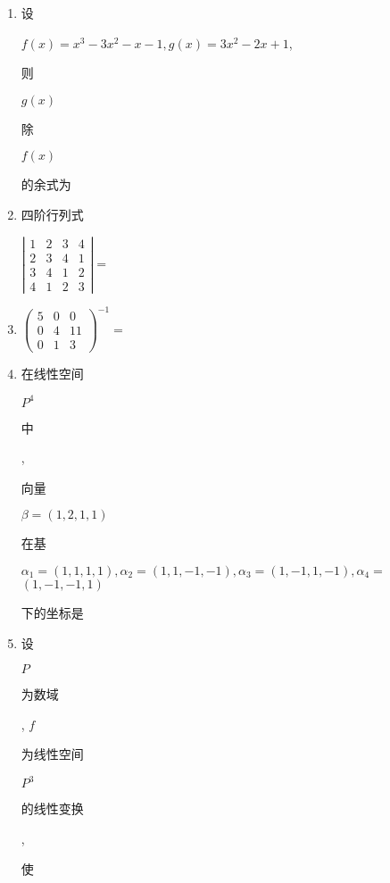 \documentclass[10pt]{article}
\begin{document}
\begin{enumerate}
  \item \begin{CJK}{UTF8}{mj}设\end{CJK} $f(x)=x^{3}-3 x^{2}-x-1, g(x)=3 x^{2}-2 x+1$, \begin{CJK}{UTF8}{mj}则\end{CJK} $g(x)$ \begin{CJK}{UTF8}{mj}除\end{CJK} $f(x)$ \begin{CJK}{UTF8}{mj}的余式为\end{CJK}

  \item \begin{CJK}{UTF8}{mj}四阶行列式\end{CJK} $\left|\begin{array}{llll}1 & 2 & 3 & 4 \\ 2 & 3 & 4 & 1 \\ 3 & 4 & 1 & 2 \\ 4 & 1 & 2 & 3\end{array}\right|=$

  \item $\left(\begin{array}{ccc}5 & 0 & 0 \\ 0 & 4 & 11 \\ 0 & 1 & 3\end{array}\right)^{-1}=$

  \item \begin{CJK}{UTF8}{mj}在线性空间\end{CJK} $P^{4}$ \begin{CJK}{UTF8}{mj}中\end{CJK}, \begin{CJK}{UTF8}{mj}向量\end{CJK} $\beta=(1,2,1,1)$ \begin{CJK}{UTF8}{mj}在基\end{CJK} $\alpha_{1}=(1,1,1,1), \alpha_{2}=(1,1,-1,-1), \alpha_{3}=(1,-1,1,-1), \alpha_{4}=$ $(1,-1,-1,1)$ \begin{CJK}{UTF8}{mj}下的坐标是\end{CJK}

  \item \begin{CJK}{UTF8}{mj}设\end{CJK} $P$ \begin{CJK}{UTF8}{mj}为数域\end{CJK}, $f$ \begin{CJK}{UTF8}{mj}为线性空间\end{CJK} $P^{3}$ \begin{CJK}{UTF8}{mj}的线性变换\end{CJK}, \begin{CJK}{UTF8}{mj}使\end{CJK}

\end{enumerate}
\end{document}
